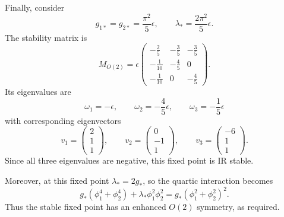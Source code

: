 \begin{solution}
Finally, consider
\begin{equation}
g_{1*}=g_{2*}=\frac{\pi^2}{5}\epsilon,
\qquad
\lambda_*=\frac{2\pi^2}{5}\epsilon.
\end{equation}
The stability matrix is
\begin{equation}
M_{O(2)}
=
\epsilon
\begin{pmatrix}
-\frac25&-\frac35&-\frac35\\
-\frac1{10}&-\frac45&0\\
-\frac1{10}&0&-\frac45
\end{pmatrix}.
\end{equation}
Its eigenvalues are
\begin{equation}
\omega_1=-\epsilon,
\qquad
\omega_2=-\frac45\epsilon,
\qquad
\omega_3=-\frac15\epsilon
\end{equation}
with corresponding eigenvectors
\begin{equation}
v_1=
\begin{pmatrix}2\\1\\1\end{pmatrix},
\qquad
v_2=
\begin{pmatrix}0\\-1\\1\end{pmatrix},
\qquad
v_3=
\begin{pmatrix}-6\\1\\1\end{pmatrix}.
\end{equation}
Since all three eigenvalues are negative, this fixed point is IR stable.

Moreover, at this fixed point $\lambda_*=2g_*$, so the quartic interaction becomes
\begin{equation}
g_*(\phi_1^4+\phi_2^4)
+\lambda_*\phi_1^2\phi_2^2
=
g_*(\phi_1^2+\phi_2^2)^2.
\end{equation}
Thus the stable fixed point has an enhanced $O(2)$ symmetry, as required.
\end{solution}
